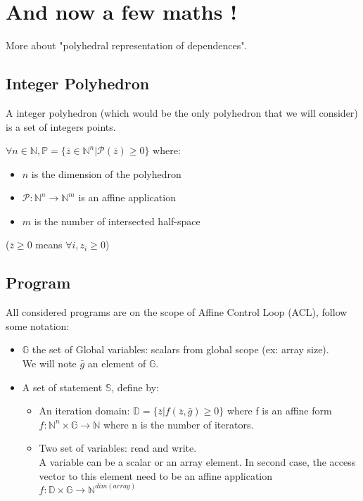 	\section{And now a few maths !}

More about "polyhedral representation of dependences".

		\subsection{Integer Polyhedron}

A integer polyhedron (which would be the only polyhedron that we will consider) is a set of integers points.

$\forall n \in \mathbb{N}, \mathbb{P} = \{\bar{z} \in \mathbb{N}^{n} | \mathcal{P}(\bar{z}) \geq 0 \}$ where:
\begin{itemize}
	\item $n$ is the dimension of the polyhedron
	\item $\mathcal{P}: \mathbb{N}^{n} \rightarrow \mathbb{N}^{m}$ is an affine application
	\item $m$ is the number of intersected half-space
\end{itemize}
($\bar{z} \geq 0$ means $\forall i, z_{i} \geq 0$)

		\subsection{Program}

All considered programs are on the scope of Affine Control Loop (ACL), follow some notation:
\begin{itemize}
	\item $\mathbb{G}$ the set of Global variables: scalars from global scope (ex: array size).\\
	We will note $\bar{g}$ an element of $\mathbb{G}$.
	\item A set of statement $\mathbb{S}$, define by:
	\begin{itemize}
		\item An iteration domain: $\mathbb{D} = \{\bar{z} | f(\bar{z}, \bar{g}) \geq 0\}$ where f is an affine
				form $f: \mathbb{N}^{n} \times \mathbb{G} \rightarrow \mathbb{N}$ where n is the number
				of iterators.
		\item Two set of variables: read and write.\\
		A variable can be a scalar or an array element. In second case, the access vector to this element need to
		be an affine application $f: \mathbb{D} \times \mathbb{G} \rightarrow \mathbb{N}^{dim(array)}$
	\end{itemize}
\end{itemize}

